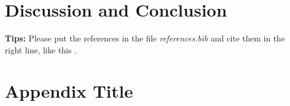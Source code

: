 \documentclass{article}
\begin{document}




\section{Discussion and Conclusion}\label{sec:dis&res}


    
    
 
 \textbf{Tips:} Please put the references in the file \emph{references.bib} and cite them in the right line, like this \cite{hadash2018estimate}.

\appendix
\section{Appendix Title}
\label{app:f18-runningtime}



\label{app:f23-runningtime}



  
  
\end{document}

